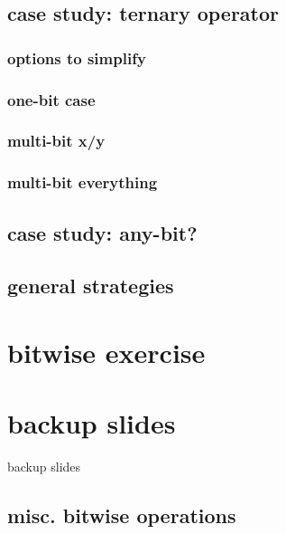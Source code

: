 

\subsection{case study: ternary operator}


\subsubsection{options to simplify}


\subsubsection{one-bit case}


\subsubsection{multi-bit x/y}


\subsubsection{multi-bit everything}



\subsection{case study: any-bit?}



\subsection{general strategies}



\section{bitwise exercise}


\section{backup slides}
\begin{frame}{backup slides}
\end{frame}


\subsection{misc. bitwise operations}



